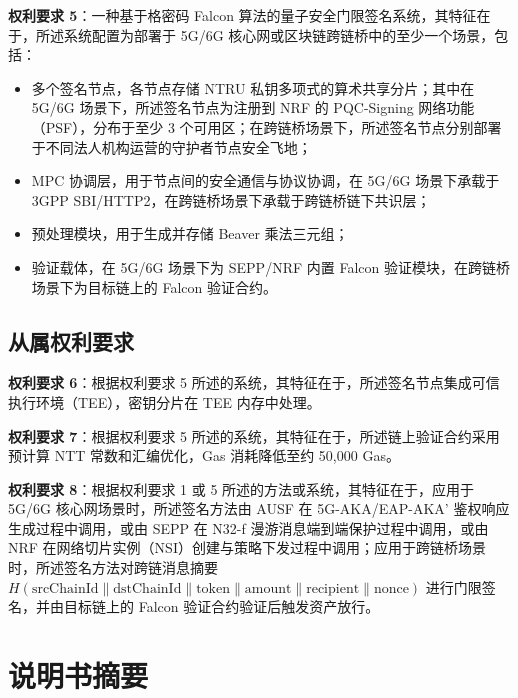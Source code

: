 \documentclass[12pt,a4paper]{article}
\begin{document}
\textbf{权利要求 5}：一种基于格密码 Falcon 算法的量子安全门限签名系统，其特征在于，所述系统配置为部署于 5G/6G 核心网或区块链跨链桥中的至少一个场景，包括：
\begin{itemize}
    \item 多个签名节点，各节点存储 NTRU 私钥多项式的算术共享分片；其中在 5G/6G 场景下，所述签名节点为注册到 NRF 的 PQC-Signing 网络功能（PSF），分布于至少 3 个可用区；在跨链桥场景下，所述签名节点分别部署于不同法人机构运营的守护者节点安全飞地；
    \item MPC 协调层，用于节点间的安全通信与协议协调，在 5G/6G 场景下承载于 3GPP SBI/HTTP2，在跨链桥场景下承载于跨链桥链下共识层；
    \item 预处理模块，用于生成并存储 Beaver 乘法三元组；
    \item 验证载体，在 5G/6G 场景下为 SEPP/NRF 内置 Falcon 验证模块，在跨链桥场景下为目标链上的 Falcon 验证合约。
\end{itemize}

\subsection{从属权利要求}

\textbf{权利要求 6}：根据权利要求 5 所述的系统，其特征在于，所述签名节点集成可信执行环境（TEE），密钥分片在 TEE 内存中处理。

\textbf{权利要求 7}：根据权利要求 5 所述的系统，其特征在于，所述链上验证合约采用预计算 NTT 常数和汇编优化，Gas 消耗降低至约 50,000 Gas。

\textbf{权利要求 8}：根据权利要求 1 或 5 所述的方法或系统，其特征在于，应用于 5G/6G 核心网场景时，所述签名方法由 AUSF 在 5G-AKA/EAP-AKA' 鉴权响应生成过程中调用，或由 SEPP 在 N32-f 漫游消息端到端保护过程中调用，或由 NRF 在网络切片实例（NSI）创建与策略下发过程中调用；应用于跨链桥场景时，所述签名方法对跨链消息摘要 $H(\text{srcChainId} \| \text{dstChainId} \| \text{token} \| \text{amount} \| \text{recipient} \| \text{nonce})$ 进行门限签名，并由目标链上的 Falcon 验证合约验证后触发资产放行。

\section{说明书摘要}
\end{document}
